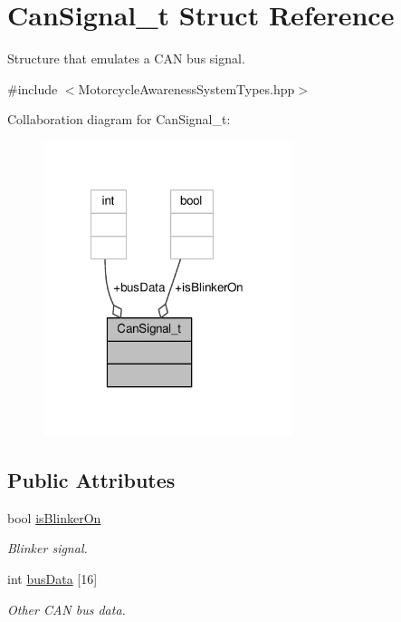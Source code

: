 \hypertarget{structCanSignal__t}{\section{Can\-Signal\-\_\-t Struct Reference}
\label{structCanSignal__t}
}


Structure that emulates a C\-A\-N bus signal.  




{\ttfamily \#include $<$Motorcycle\-Awareness\-System\-Types.\-hpp$>$}



Collaboration diagram for Can\-Signal\-\_\-t\-:\nopagebreak
\begin{figure}[H]
\begin{center}
\leavevmode
\includegraphics[width=206pt]{structCanSignal__t__coll__graph}
\end{center}
\end{figure}
\subsection*{Public Attributes}
\begin{DoxyCompactItemize}
\item 
bool \hyperlink{structCanSignal__t_a209edc6387534529f57c2362ec8f2586}{is\-Blinker\-On}
\begin{DoxyCompactList}\small\item\em Blinker signal. \end{DoxyCompactList}\item 
int \hyperlink{structCanSignal__t_a460bece1b65aa03b07f986c71f818456}{bus\-Data} \mbox{[}16\mbox{]}
\begin{DoxyCompactList}\small\item\em Other C\-A\-N bus data. \end{DoxyCompactList}\end{DoxyCompactItemize}


